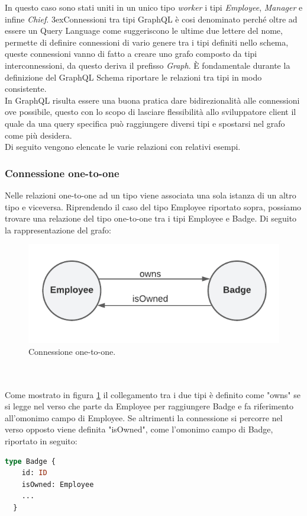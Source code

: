 In questo caso sono stati uniti in un unico tipo \textit{worker} i tipi \textit{Employee}, \textit{Manager} e infine \textit{Chief}.
3ex{Connessioni tra tipi}
GraphQL è cosi denominato perché oltre ad essere un Query Language come suggeriscono le ultime due lettere del nome, permette di definire connessioni di vario genere tra i tipi definiti nello schema, queste connessioni vanno di fatto a creare uno grafo composto da tipi interconnessioni, da questo deriva il prefisso \textit{Graph}.
È fondamentale durante la definizione del GraphQL Schema riportare le relazioni tra tipi in modo consistente. \\
In GraphQL risulta essere una buona pratica dare bidirezionalità alle connessioni ove possibile, questo con lo scopo di lasciare flessibilità allo sviluppatore client il quale da una query specifica può raggiungere diversi tipi e spostarsi nel grafo come più desidera.\\
Di seguito vengono elencate le varie relazioni con relativi esempi.
\subsubsection*{Connessione one-to-one}
Nelle relazioni one-to-one ad un tipo viene associata una sola istanza di un altro tipo e viceversa. Riprendendo il caso del tipo Employee riportato sopra, possiamo trovare una relazione del tipo one-to-one tra i tipi Employee e Badge. Di seguito la rappresentazione del grafo:
\begin{figure}[!h]
\centering
\includegraphics[width=0.5\linewidth]{immagini/one_to_one.pdf}
\caption{Connessione one-to-one.}
\label{one-to-one}
\end{figure}
\\ \\
Come mostrato in figura \ref{one-to-one} il collegamento tra i due tipi è definito come "owns" se si legge nel verso che parte da Employee per raggiungere Badge e fa riferimento all'omonimo campo di Employee. Se altrimenti la connessione si percorre nel verso opposto viene definita "isOwned", come l'omonimo campo di Badge, riportato in seguito:
\begin{lstlisting}[language=GraphQL,]
  type Badge {
    id: ID
    isOwned: Employee
    ...
  }
\end{lstlisting}
